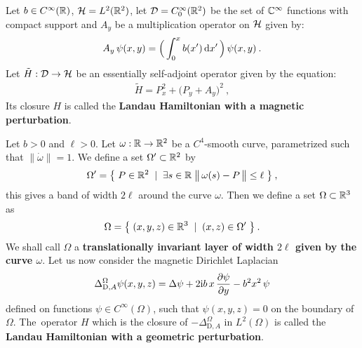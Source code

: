 \begin{defn}
    \label{defn-perturb-magnet}
    Let $b \in C^\infty(\mathbb{R})$, $\mathcal{H} = L^2(\mathbb{R}^2)$, let $\mathcal{D} = C^\infty_0(\mathbb{R}^2)$ be the set of $\mathbb{C}^\infty$ functions with compact support and $A_y$ be a multiplication operator on $\mathcal{H}$ given by:
    \begin{align*}
        A_y \, \psi(x, y) = \Big( \int_0^x b(x') \, \mathrm{d}x' \, \Big) \, \psi(x, y) \: .
    \end{align*}
    Let $\tilde H: \mathcal{D} \to \mathcal{H}$ be an essentially self-adjoint operator given by the equation:
    \begin{align*}
        \tilde H = P^2_x + \big( P_y + A_y \big)^2 \: ,
    \end{align*}
    Its closure $H$ is called the \textbf{Landau Hamiltonian with a magnetic perturbation}.
\end{defn}

\begin{defn}
    \label{defn-perturb-geom}
    Let $b>0$ and $\ell > 0$. Let $\omega: \mathbb{R} \to \mathbb{R}^2$ be a $C^4$-smooth curve, parametrized such that $\lVert\dot\omega\rVert=1$. We define a set $\Omega' \subset \mathbb{R}^2$ by
    \begin{equation*}
        \Omega' = \big\{\;
            P \in \mathbb{R}^2
        \;\;|\;\;
            \exists s \in \mathbb{R} \;
            \big\lVert  \, \omega(s) - P \,  \big\rVert \leq \ell
        \;\big\}
        \: ,
    \end{equation*}
    this gives a band of width $2\ell$ around the curve $\omega$. \!Then we define a set $\Omega \subset \mathbb{R}^3$ as
    \begin{equation*}
        \Omega = \big\{\;
            (x, y, z) \in \mathbb{R}^3
        \;\;|\;\;
            (x, z) \in \Omega'
        \;\big\} \: .
    \end{equation*}
    We shall call $\Omega$ a \textbf{translationally invariant layer of width $2\ell$ given by the curve $\omega$}. Let us now consider the magnetic Dirichlet Laplacian
    \begin{align*}
        \Delta^\Omega_{\mathrm{D}, A} \psi(x,y,z)
        = \Delta \psi + 2\mathrm{i} b \, x \, \frac{\partial \psi}{\partial y} - b^2 x^2 \, \psi
    \end{align*}
    defined on functions $\psi \in C^\infty(\Omega)$, such that $\psi(x,y,z) = 0$ on the boundary of $\Omega$. The~operator $H$ which is the closure of $-\Delta^\Omega_{\mathrm{D}, A}$ in $L^2(\Omega)$ is called the \textbf{Landau Hamiltonian with a geometric perturbation}.
\end{defn}

